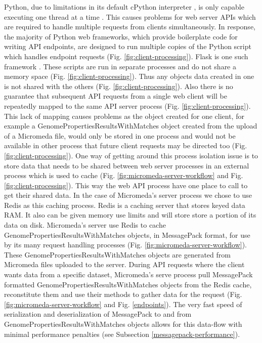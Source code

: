Python, due to limitations in its default cPython interpreter \cite{van1995python}, is only capable executing one thread at a time \cite{beazley2010understanding}. This causes problems for web server APIs which are required to handle multiple requests from clients simultaneously. In response, the majority of Python web frameworks, which provide boilerplate code for writing API endpoints, are designed to run multiple copies of the Python script which handles endpoint requests (Fig. \ref{fig:client-processing}). Flask is one such framework \cite{grinberg2018flask}. These scripts are run in separate processes and do not share a memory space (Fig. \ref{fig:client-processing}). Thus any objects data created in one is not shared with the others (Fig. \ref{fig:client-processing}). Also there is no guarantee that subsequent API requests from a single web client will be repeatedly mapped to the same API server process (Fig. \ref{fig:client-processing}). This lack of mapping causes problems as the object created for one client, for example a GenomePropertiesResultsWithMatches object created from the upload of a Micromeda file, would only be stored in one process and would not be available in other process that future client requests may be directed too (Fig. \ref{fig:client-processing}). One way of getting around this process isolation issue is to store data that needs to be shared between web server processes in an external process which is used to cache (Fig. \ref{fig:micromeda-server-workflow} and Fig. \ref{fig:client-processing}). This way the web API process have one place to call to get their shared data. In the case of Micromeda's server process we chose to use Redis as this caching process. Redis is a caching server that stores keyed data RAM. It also can be given memory use limits and will store store a portion of its data on disk. Micromeda's server use Redis to cache GenomePropertiesResultsWithMatches objects, in MessagePack format, for use by its many request handling processes (Fig. \ref{fig:micromeda-server-workflow}). These GenomePropertiesResultsWithMatches objects are generated from Micromeda files uploaded to the server. During API requests where the client wants data from a specific dataset, Micromeda's serve process pull MessagePack formatted GenomePropertiesResultsWithMatches objects from the Redis cache, reconstitute them and use their methods to gather data for the request (Fig. \ref{fig:micromeda-server-workflow}  and Fig. \ref{endpoints}). The very fast speed of serialization and deserialization of MessagePack to and from GenomePropertiesResultsWithMatches objects allows for this data-flow with minimal performance penalties (see Subsection \ref{messagepack-performance}).

